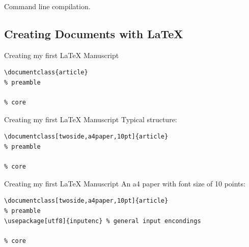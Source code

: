 \begin{frame}{Command line compilation.}
\end{frame}



\subsection{Creating Documents with \LaTeX{}}
\begin{frame}[fragile]{Creating my first \LaTeX{} Manuscript}
\begin{verbatim}
\documentclass{article}
% preamble

% core

\end{verbatim}
\end{frame}


\begin{frame}[fragile]{Creating my first \LaTeX{} Manuscript}
Typical structure:
\footnotesize
\begin{verbatim}
\documentclass[twoside,a4paper,10pt]{article}
% preamble

% core

\end{verbatim}
\end{frame}

\begin{frame}[fragile]{Creating my first \LaTeX{} Manuscript}
An a4 paper with font size of 10 points:
\footnotesize
\begin{verbatim}
\documentclass[twoside,a4paper,10pt]{article}
% preamble
\usepackage[utf8]{inputenc} % general input encondings

% core

\end{verbatim}
\end{frame}

